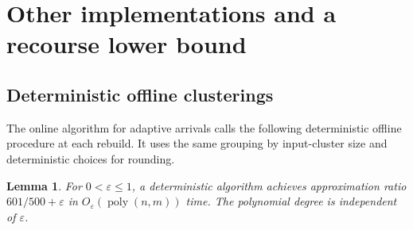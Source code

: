\documentclass[11pt]{article}
\newtheorem{lemma}[theorem]{Lemma}
\begin{document}
\section{Other implementations and a recourse lower bound}

\subsection{Deterministic offline clusterings}
\label{app:deterministic-seed}

The online algorithm for adaptive arrivals calls the following
deterministic offline procedure at each rebuild. It uses the
same grouping by input-cluster size and deterministic choices for rounding.

\begin{lemma}\label{off:det}
For $0<\varepsilon\le1$, a deterministic algorithm achieves
approximation ratio $601/500+\varepsilon$ in
$O_\varepsilon(\operatorname{poly}(n,m))$ time. The polynomial degree
is independent of $\varepsilon$.
\end{lemma}
\end{document}
